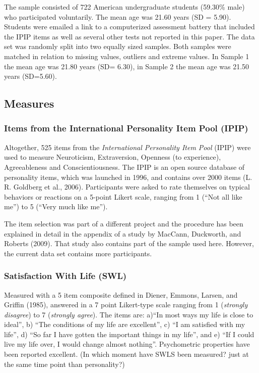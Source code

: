 \documentclass[,man,floatsintext]{apa6}
\begin{document}
The sample consisted of 722 American undergraduate students (59.30\%
male) who participated voluntarily. The mean age was 21.60 years (SD =
5.90). Students were emailed a link to a computerized assessment battery
that included the IPIP items as well as several other tests not reported
in this paper. The data set was randomly split into two equally sized
samples. Both samples were matched in relation to missing values,
outliers and extreme values. In Sample 1 the mean age was 21.80 years
(SD= 6.30), in Sample 2 the mean age was 21.50 years (SD=5.60).

\subsection{Measures}\label{measures}

\subsubsection{Items from the International Personality Item Pool
(IPIP)}\label{items-from-the-international-personality-item-pool-ipip}

Altogether, 525 items from the \emph{International Personality Item
Pool} (IPIP) were used to measure Neuroticism, Extraversion, Openness
(to experience), Agreeableness and Conscientiousness. The IPIP is an
open source database of personality items, which was launched in 1996,
and contains over 2000 items (L. R. Goldberg et al., 2006). Participants
were asked to rate themselves on typical behaviors or reactions on a
5-point Likert scale, ranging from 1 (\enquote{Not all like me}) to 5
(\enquote{Very much like me}).

The item selection was part of a different project and the procedure has
been explained in detail in the appendix of a study by MacCann,
Duckworth, and Roberts (2009). That study also contains part of the
sample used here. However, the current data set contains more
participants.

\subsubsection{Satisfaction With Life
(SWL)}\label{satisfaction-with-life-swl}

Measured with a 5 item composite defined in Diener, Emmons, Larsen, and
Griffin (1985), answered in a 7 point Likert-type scale ranging from 1
(\emph{strongly disagree}) to 7 (\emph{strongly agree}). The items are:
a)\enquote{In most ways my life is close to ideal}, b) \enquote{The
conditions of my life are excellent}, c) \enquote{I am satisfied with my
life}, d) \enquote{So far I have gotten the important things in my
life}, and e) \enquote{If I could live my life over, I would change
almost nothing}. Psychometric properties have been reported excellent.
(In which moment have SWLS been measured? just at the same time point
than personality?)
\end{document}
